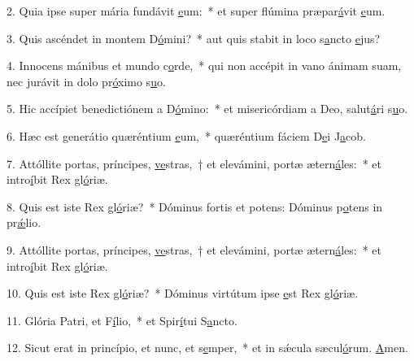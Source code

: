 2. Quia ipse super mária fundávit \uline{e}um:~* et super flúmina præpar\uline{á}vit \uline{e}um.\par 
3. Quis ascéndet in montem D\uline{ó}mini?~* aut quis stabit in loco s\uline{a}ncto \uline{e}jus?\par 
4. Innocens mánibus et mundo c\uline{o}rde,~* qui non accépit in vano ánimam suam, nec jurávit in dolo pr\uline{ó}ximo s\uline{u}o.\par 
5. Hic accípiet benedictiónem a D\uline{ó}mino:~* et misericórdiam a Deo, salut\uline{á}ri s\uline{u}o.\par 
6. Hæc est generátio quæréntium \uline{e}um,~* quæréntium fáciem D\uline{e}i J\uline{a}cob.\par 
7. Attóllite portas, príncipes, \uline{ve}stras,~† et elevámini, portæ ætern\uline{á}les:~* et intro\uline{í}bit Rex gl\uline{ó}riæ.\par 
8. Quis est iste Rex gl\uline{ó}riæ?~* Dóminus fortis et potens: Dóminus p\uline{o}tens in pr\uline{ǽ}lio.\par 
9. Attóllite portas, príncipes, \uline{ve}stras,~† et elevámini, portæ ætern\uline{á}les:~* et intro\uline{í}bit Rex gl\uline{ó}riæ.\par 
10. Quis est iste Rex gl\uline{ó}riæ?~* Dóminus virtútum ipse \uline{e}st Rex gl\uline{ó}riæ.\par 
11. Glória Patri, et F\uline{í}lio,~* et Spir\uline{í}tui S\uline{a}ncto.\par 
12. Sicut erat in princípio, et nunc, et s\uline{e}mper,~* et in sǽcula sæcul\uline{ó}rum. \uline{A}men.\par 
